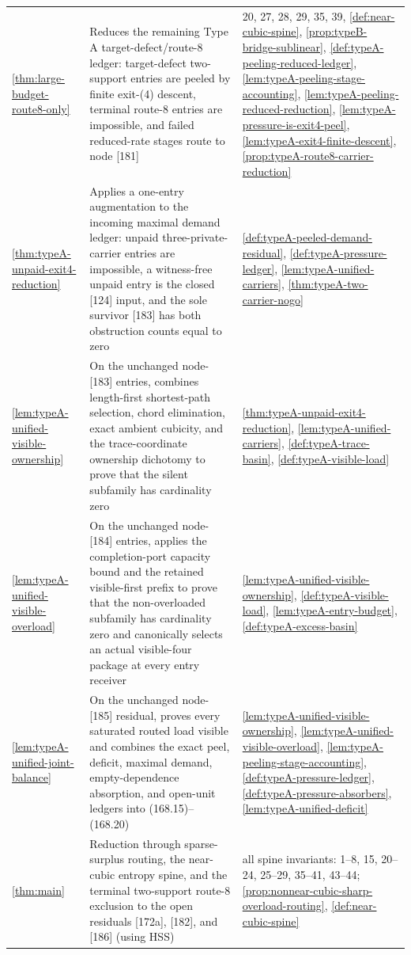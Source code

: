 \documentclass[11pt]{article}
\begin{document}
{\begin{longtable}{L{0.31\textwidth} L{0.42\textwidth} L{0.17\textwidth}}
\cref{thm:large-budget-route8-only} & Reduces the remaining Type A target-defect/route-8 ledger: target-defect two-support entries are peeled by finite exit-\textup{(4)} descent, terminal route-8 entries are impossible, and failed reduced-rate stages route to node [181] & 20, 27, 28, 29, 35, 39, \cref{def:near-cubic-spine}, \cref{prop:typeB-bridge-sublinear}, \cref{def:typeA-peeling-reduced-ledger}, \cref{lem:typeA-peeling-stage-accounting}, \cref{lem:typeA-peeling-reduced-reduction}, \cref{lem:typeA-pressure-is-exit4-peel}, \cref{lem:typeA-exit4-finite-descent}, \cref{prop:typeA-route8-carrier-reduction} \\
\cref{thm:typeA-unpaid-exit4-reduction} & Applies a one-entry augmentation to the incoming maximal demand ledger: unpaid three-private-carrier entries are impossible, a witness-free unpaid entry is the closed [124] input, and the sole survivor [183] has both obstruction counts equal to zero & \cref{def:typeA-peeled-demand-residual}, \cref{def:typeA-pressure-ledger}, \cref{lem:typeA-unified-carriers}, \cref{thm:typeA-two-carrier-nogo} \\
\cref{lem:typeA-unified-visible-ownership} & On the unchanged node-[183] entries, combines length-first shortest-path selection, chord elimination, exact ambient cubicity, and the trace-coordinate ownership dichotomy to prove that the silent subfamily has cardinality zero & \cref{thm:typeA-unpaid-exit4-reduction}, \cref{lem:typeA-unified-carriers}, \cref{def:typeA-trace-basin}, \cref{def:typeA-visible-load} \\
\cref{lem:typeA-unified-visible-overload} & On the unchanged node-[184] entries, applies the completion-port capacity bound and the retained visible-first prefix to prove that the non-overloaded subfamily has cardinality zero and canonically selects an actual visible-four package at every entry receiver & \cref{lem:typeA-unified-visible-ownership}, \cref{def:typeA-visible-load}, \cref{lem:typeA-entry-budget}, \cref{def:typeA-excess-basin} \\
\cref{lem:typeA-unified-joint-balance} & On the unchanged node-[185] residual, proves every saturated routed load visible and combines the exact peel, deficit, maximal demand, empty-dependence absorption, and open-unit ledgers into \textup{(168.15)}--\textup{(168.20)} & \cref{lem:typeA-unified-visible-ownership}, \cref{lem:typeA-unified-visible-overload}, \cref{lem:typeA-peeling-stage-accounting}, \cref{def:typeA-pressure-ledger}, \cref{def:typeA-pressure-absorbers}, \cref{lem:typeA-unified-deficit} \\
\cref{thm:main} & Reduction through sparse-surplus routing, the near-cubic entropy spine, and the terminal two-support route-8 exclusion to the open residuals [172a], [182], and [186] (using HSS) & all spine invariants: 1--8, 15, 20--24, 25--29, 35--41, 43--44; \cref{prop:nonnear-cubic-sharp-overload-routing}, \cref{def:near-cubic-spine} \\
\bottomrule
\end{longtable}
}
\end{document}
